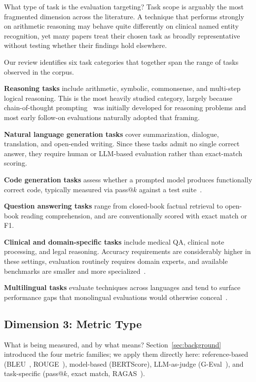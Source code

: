\documentclass[journal]{IEEEtran}
\begin{document}
What type of task is the evaluation targeting? Task scope is arguably the most
fragmented dimension across the literature. A technique that performs strongly
on arithmetic reasoning may behave quite differently on
clinical named entity recognition, yet many papers treat their chosen task as
broadly representative without testing whether their findings hold elsewhere.

Our review identifies six task categories that together span the range of tasks observed in the corpus.

\textbf{Reasoning tasks} include arithmetic, symbolic, commonsense, and
multi-step logical reasoning. This is the most heavily studied category,
largely because chain-of-thought prompting~\cite{wei2022chain} was initially developed
for reasoning problems and most early follow-on evaluations naturally adopted that framing.

\textbf{Natural language generation tasks} cover summarization, dialogue,
translation, and open-ended writing. Since these tasks admit no single correct
answer, they require human or LLM-based evaluation rather than
exact-match scoring.

\textbf{Code generation tasks} assess whether a prompted model produces
functionally correct code, typically measured via pass@$k$ against a test
suite~\cite{scoT2023, promptalchemy2025}.

\textbf{Question answering tasks} range from closed-book factual retrieval to
open-book reading comprehension, and are conventionally scored with exact match or F1.

\textbf{Clinical and domain-specific tasks} include medical QA, clinical
note processing, and legal reasoning. Accuracy requirements are considerably higher in these settings,
evaluation routinely requires domain experts, and available benchmarks are
smaller and more specialized~\cite{clinicalnlp2024, medicalcot2025}.

\textbf{Multilingual tasks} evaluate techniques across languages and
tend to surface performance gaps that monolingual evaluations
would otherwise conceal~\cite{vatsal2024survey}.

\subsection{Dimension 3: Metric Type}

What is being measured, and by what means? Section~\ref{sec:background} introduced
the four metric families; we apply them directly here: reference-based
(BLEU~\cite{papineni2002bleu}, ROUGE~\cite{lin2004rouge}), model-based
(BERTScore), LLM-as-judge (G-Eval~\cite{liu2023geval}), and
task-specific (pass@$k$, exact match, RAGAS~\cite{rageval2024}).
\end{document}
